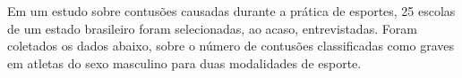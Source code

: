 \question Em um estudo sobre contusões causadas durante a prática de esportes, 25 escolas de um estado brasileiro foram selecionadas, ao acaso, entrevistadas. Foram coletados os dados abaixo, sobre o número de contusões classificadas como graves em atletas do sexo masculino para duas modalidades de esporte.
